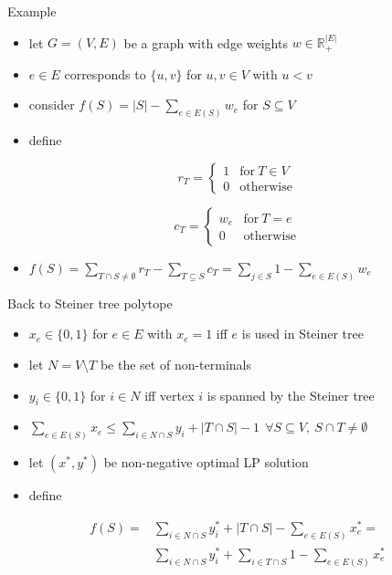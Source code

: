 \documentclass[usenames,dvipsnames]{beamer}
\newcommand{\R}{\mathbb{R}}
\begin{document}
\begin{frame}{Example}
  \begin{itemize}
    \item let $G = (V,E)$ be a graph with edge weights $w \in
      \R_+^{|E|}$
    \item $e \in E$ corresponds to $\{u,v\}$ for $u,v \in V$ with
      $u<v$
    \item consider $f(S) = |S| - \sum\limits_{e \in E(S)} w_e$ for $S
      \subseteq V$
    \item define 
  \end{itemize}
  \begin{minipage}{0.49\textwidth}
    \[r_T = \begin{cases} 1 & \text{for}~T \in V\\
      0 & \text{otherwise}\end{cases}\]
  \end{minipage}
  \begin{minipage}{0.49\textwidth}
    \[c_T = \begin{cases} w_e & \text{for}~T=e\\
      0 & \text{otherwise}\end{cases}\]
  \end{minipage}
  \begin{itemize}
  \item $f(S) = \sum\limits_{T \cap S \neq \emptyset} r_T - \sum\limits_{T \subseteq S} c_T = \sum\limits_{j \in S} 1 - \sum\limits_{e \in E(S)} w_e$
  \end{itemize}
\end{frame}

\begin{frame}{Back to Steiner tree polytope}
  \begin{itemize}
  \item $x_e \in \{0,1\}$ for $e \in E$ with $x_e = 1$ iff  $e$ is used in Steiner tree
  \item let $N = V \setminus T$ be the set of non-terminals
  \item $y_i \in \{0,1\}$ for $i \in N$ iff vertex $i$ is spanned by the Steiner tree
  \item $\sum\limits_{e \in E(S)} x_e \leq \sum\limits_{i \in N \cap S} y_i + |T \cap S| -1~~\forall S \subseteq V,~S \cap T \neq \emptyset$
  \item let $(x^*, y^*)$ be non-negative optimal LP solution
  \item define
  \end{itemize}
  \begin{align*}f(S) = &\sum\limits_{i \in N \cap S} y^*_i + |T \cap S| - \sum\limits_{e \in E(S)} x^*_e = \\ &\sum\limits_{i \in N \cap S} y^*_i + \sum\limits_{i
    \in T \cap S} 1 - \sum\limits_{e \in E(S)} x^*_e\end{align*}
\end{frame}
\end{document}
